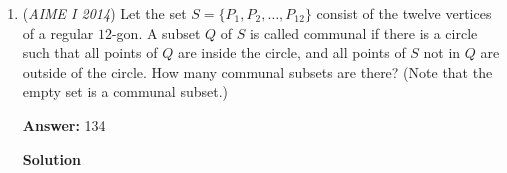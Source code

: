 \begin{enumerate}
 This question assumes the trains' lengths in MILES:
 \[\frac{440}{9}\cdot \frac{1}{60}=\frac{440}{540}=\frac{22}{27}\text{ miles}\]Adding up, we get $22+27=\boxed{049}$.

 



\textbf{Solution 3}

Let the length of the trains be $L$, let the rate of the westward train be $W_{R}$, ;et the rate of the eastward train be $E_{R}$, and let the time it takes for the eastward train to pass Steve be $E_{T}$.

 We have that

 $L=(\frac{1}{60})(W_{R}+20)$
$L=(\frac{1}{60})(E_{R}-20)$.

 Adding both of the equations together, we get that 

 $2L=\frac{W_{R}}{60}+\frac{E_{R}}{60}\implies 120L=W_{R}+E_{R}$.

 Now, from the second part of the problem, we acquire that

 $L=(E_{T})(E_{R}+20)$
$L=(10E_{T})(W_{R}-20)$

 Dividing the second equation by the first, we get that...$1=\frac{10(W_{R}-20)}{E_{R}+20}\implies E_{R}+20=10W_{R}-200\implies E_{R}+220=10W_{R}\implies E_{R}=10W_{R}-220$.

 Now, substituting into the $120L=W_{R}+E_{R}$.

 $120L=W_{R}+(10W_{R}-220)\implies 120L= 11W_{R}-220\implies W_{R}=\frac{120L+220}{11}$.

 Finally, plugging this back into our very first equation..

 $L=(\frac{1}{60})((\frac{120L+220}{11})+20)\implies 660L=120L+440\implies 540L=440\implies L=\frac{22}{27}$.

 Hence, the answer is $22+27=\boxed{049}$.

 


	\item (\textit{AIME I 2014}) Let the set $S = \{P_1, P_2, \dots, P_{12}\}$ consist of the twelve vertices of a regular $12$-gon. A subset $Q$ of $S$ is called communal if there is a circle such that all points of $Q$ are inside the circle, and all points of $S$ not in $Q$ are outside of the circle. How many communal subsets are there? (Note that the empty set is a communal subset.)


 
 \textbf{Answer: }134



\textbf{Solution}


\end{enumerate}
